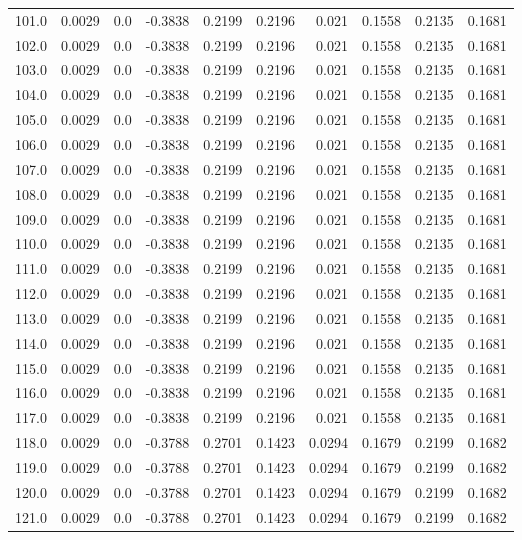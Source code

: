 \begin{longtable}{lrrrrrrrrr}
101.0 & 0.0029 & 0.0 & -0.3838 & 0.2199 & 0.2196 & 0.021 & 0.1558 & 0.2135 & 0.1681 \\
102.0 & 0.0029 & 0.0 & -0.3838 & 0.2199 & 0.2196 & 0.021 & 0.1558 & 0.2135 & 0.1681 \\
103.0 & 0.0029 & 0.0 & -0.3838 & 0.2199 & 0.2196 & 0.021 & 0.1558 & 0.2135 & 0.1681 \\
104.0 & 0.0029 & 0.0 & -0.3838 & 0.2199 & 0.2196 & 0.021 & 0.1558 & 0.2135 & 0.1681 \\
105.0 & 0.0029 & 0.0 & -0.3838 & 0.2199 & 0.2196 & 0.021 & 0.1558 & 0.2135 & 0.1681 \\
106.0 & 0.0029 & 0.0 & -0.3838 & 0.2199 & 0.2196 & 0.021 & 0.1558 & 0.2135 & 0.1681 \\
107.0 & 0.0029 & 0.0 & -0.3838 & 0.2199 & 0.2196 & 0.021 & 0.1558 & 0.2135 & 0.1681 \\
108.0 & 0.0029 & 0.0 & -0.3838 & 0.2199 & 0.2196 & 0.021 & 0.1558 & 0.2135 & 0.1681 \\
109.0 & 0.0029 & 0.0 & -0.3838 & 0.2199 & 0.2196 & 0.021 & 0.1558 & 0.2135 & 0.1681 \\
110.0 & 0.0029 & 0.0 & -0.3838 & 0.2199 & 0.2196 & 0.021 & 0.1558 & 0.2135 & 0.1681 \\
111.0 & 0.0029 & 0.0 & -0.3838 & 0.2199 & 0.2196 & 0.021 & 0.1558 & 0.2135 & 0.1681 \\
112.0 & 0.0029 & 0.0 & -0.3838 & 0.2199 & 0.2196 & 0.021 & 0.1558 & 0.2135 & 0.1681 \\
113.0 & 0.0029 & 0.0 & -0.3838 & 0.2199 & 0.2196 & 0.021 & 0.1558 & 0.2135 & 0.1681 \\
114.0 & 0.0029 & 0.0 & -0.3838 & 0.2199 & 0.2196 & 0.021 & 0.1558 & 0.2135 & 0.1681 \\
115.0 & 0.0029 & 0.0 & -0.3838 & 0.2199 & 0.2196 & 0.021 & 0.1558 & 0.2135 & 0.1681 \\
116.0 & 0.0029 & 0.0 & -0.3838 & 0.2199 & 0.2196 & 0.021 & 0.1558 & 0.2135 & 0.1681 \\
117.0 & 0.0029 & 0.0 & -0.3838 & 0.2199 & 0.2196 & 0.021 & 0.1558 & 0.2135 & 0.1681 \\
118.0 & 0.0029 & 0.0 & -0.3788 & 0.2701 & 0.1423 & 0.0294 & 0.1679 & 0.2199 & 0.1682 \\
119.0 & 0.0029 & 0.0 & -0.3788 & 0.2701 & 0.1423 & 0.0294 & 0.1679 & 0.2199 & 0.1682 \\
120.0 & 0.0029 & 0.0 & -0.3788 & 0.2701 & 0.1423 & 0.0294 & 0.1679 & 0.2199 & 0.1682 \\
121.0 & 0.0029 & 0.0 & -0.3788 & 0.2701 & 0.1423 & 0.0294 & 0.1679 & 0.2199 & 0.1682 \\

\end{longtable}
